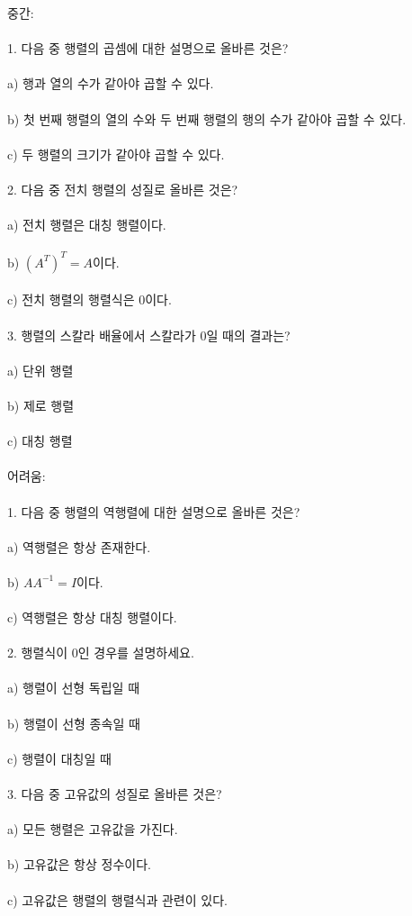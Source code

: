 \documentclass[fleqn]{article}
\begin{document}
중간: \\\\
1. 다음 중 행렬의 곱셈에 대한 설명으로 올바른 것은? \\\\
   a) 행과 열의 수가 같아야 곱할 수 있다. \\\\
   b) 첫 번째 행렬의 열의 수와 두 번째 행렬의 행의 수가 같아야 곱할 수 있다. \\\\
   c) 두 행렬의 크기가 같아야 곱할 수 있다. \\\\
  
2. 다음 중 전치 행렬의 성질로 올바른 것은? \\\\
   a) 전치 행렬은 대칭 행렬이다. \\\\
   b) \((A^T)^T = A\)이다. \\\\
   c) 전치 행렬의 행렬식은 0이다. \\\\
  
3. 행렬의 스칼라 배율에서 스칼라가 0일 때의 결과는? \\\\
   a) 단위 행렬 \\\\
   b) 제로 행렬 \\\\
   c) 대칭 행렬 \\\\
  
어려움: \\\\
1. 다음 중 행렬의 역행렬에 대한 설명으로 올바른 것은? \\\\
   a) 역행렬은 항상 존재한다. \\\\
   b) \(AA^{-1} = I\)이다. \\\\
   c) 역행렬은 항상 대칭 행렬이다. \\\\
  
2. 행렬식이 0인 경우를 설명하세요. \\\\
   a) 행렬이 선형 독립일 때 \\\\
   b) 행렬이 선형 종속일 때 \\\\
   c) 행렬이 대칭일 때 \\\\
  
3. 다음 중 고유값의 성질로 올바른 것은? \\\\
   a) 모든 행렬은 고유값을 가진다. \\\\
   b) 고유값은 항상 정수이다. \\\\
   c) 고유값은 행렬의 행렬식과 관련이 있다. \\\\
  
      
      
\end{document}
